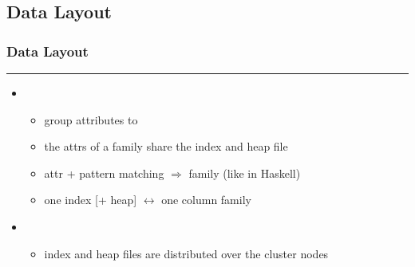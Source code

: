 \documentclass[slidestop, 14pt]{beamer}
\newcounter{contcounter}
\newcommand \ft[1] {
    \only<1>{\setcounter{contcounter}{0}}
    \addtocounter{contcounter}{1}
    \frametitle{\hfill #1 \color{gray}
    \alt<1>{}{(cont.)}}
    \hrule \vspace{1em}
}
\newenvironment{framet}[1]{
    \begin{frame} \ft{#1}
}{
    \end{frame}
}
\begin{document}
\subsection{Data Layout}
\begin{framet}{Data Layout}
\begin{itemize}
\item {}
    \begin{itemize}
    \item group attributes to 
    \item the attrs of a family share the index and heap file
    \item attr + pattern matching $\Rightarrow$ family
        {\footnotesize (like in Haskell)}
    \item one index [+ heap] $\leftrightarrow$ one column family
    \end{itemize}
\item {}
    \begin{itemize}
    \item index and heap files are distributed over the cluster nodes
    \end{itemize}
\end{itemize}
\end{framet}
\end{document}
